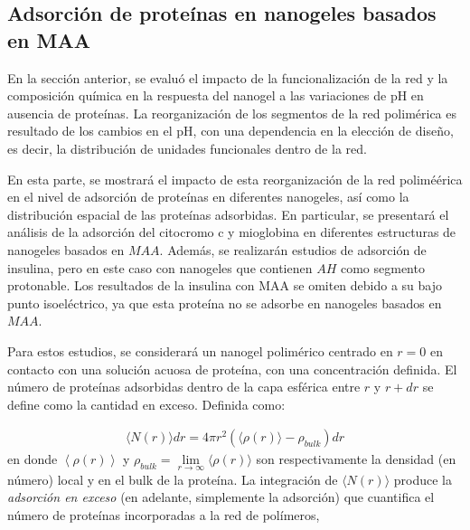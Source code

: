 \subsection{Adsorci\'on de prote\'inas en nanogeles basados en MAA}\label{sec:MAA-NGs}






En la secci\'on anterior, se evalu\'o el impacto de la funcionalizaci\'on de la red y la composici\'on qu\'imica en la respuesta del nanogel a las variaciones de pH en ausencia de prote\'inas. La reorganizaci\'on de los segmentos de la red polim\'erica es resultado de los cambios en el pH, con una dependencia en la elecci\'on de dise\~no, es decir, la distribuci\'on de unidades funcionales dentro de la red.

En esta parte, se mostrar\'a el impacto de esta reorganizaci\'on de la red polimé\'erica en el nivel de adsorci\'on de prote\'inas en diferentes nanogeles, as\'i como la distribuci\'on espacial de las prote\'inas adsorbidas. En particular, se presentar\'a el an\'alisis de la adsorci\'on del citocromo c y mioglobina en diferentes estructuras de nanogeles basados en $MAA$. Adem\'as, se realizar\'an estudios de adsorci\'on de insulina, pero en este caso con nanogeles que contienen $AH$ como segmento protonable. Los resultados de la insulina con MAA se omiten debido a su bajo punto isoel\'ectrico, ya que esta prote\'ina no se adsorbe en nanogeles basados en $MAA$.

Para estos estudios, se considerar\'a un nanogel polim\'erico centrado en $r=0$ en contacto con una soluci\'on acuosa de prote\'ina, con una concentraci\'on definida. El n\'umero de prote\'inas adsorbidas dentro de la capa esf\'erica entre $r$ y $r+dr$ se define como la cantidad en exceso. 
Definida como:


\begin{align}
     \langle N(r)\rangle dr = 4\pi r^2 \left(\langle\rho(r)\rangle - \rho_{bulk}\right) dr
\end{align}
%
en donde $\left<\rho(r)\right>$ y $\rho_{bulk}=\lim\limits_{r\to \infty } \langle\rho(r)\rangle$ son respectivamente la densidad (en n\'umero) local y en el bulk de la prote\'ina.
La integraci\'on de $\langle N(r)\rangle$ produce la \emph{adsorci\'on en exceso} (en adelante, simplemente la adsorci\'on) que cuantifica el n\'umero de prote\'inas incorporadas a la red de pol\'imeros,


